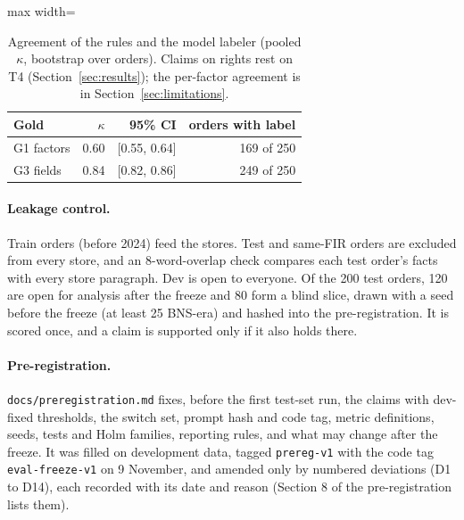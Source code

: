 \begin{table}[!t]
\centering\small
\begin{adjustbox}{max width=\textwidth}
\begin{tabular}{lrrr}
\toprule
Gold & $\kappa$ & 95\% CI & orders with label \\
\midrule
G1 factors & 0.60 & [0.55, 0.64] & 169 of 250 \\
G3 fields & 0.84 & [0.82, 0.86] & 249 of 250 \\
\bottomrule
\end{tabular}
\end{adjustbox}
\caption{Agreement of the rules and the model labeler (pooled $\kappa$, bootstrap over orders). Claims on rights rest on T4 (Section~\ref{sec:results}); the per-factor agreement is in Section~\ref{sec:limitations}.}
\label{tab:kappa}
\end{table}

\paragraph{Leakage control.} Train orders (before 2024) feed the stores. Test and same-FIR orders are excluded from every store, and an 8-word-overlap check compares each test order's facts with every store paragraph. Dev is open to everyone. Of the 200 test orders, 120 are open for analysis after the freeze and 80 form a blind slice, drawn with a seed before the freeze (at least 25 BNS-era) and hashed into the pre-registration. It is scored once, and a claim is supported only if it also holds there.

\paragraph{Pre-registration.} \texttt{docs/preregistration.md} fixes, before the first test-set run, the claims with dev-fixed thresholds, the switch set, prompt hash and code tag, metric definitions, seeds, tests and Holm families, reporting rules, and what may change after the freeze. It was filled on development data, tagged \texttt{prereg-v1} with the code tag \texttt{eval-freeze-v1} on 9 November, and amended only by numbered deviations (D1 to D14), each recorded with its date and reason (Section 8 of the pre-registration lists them).


